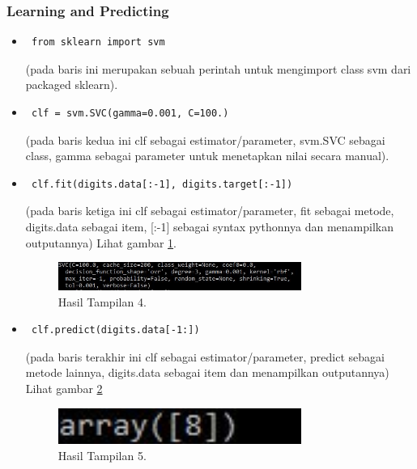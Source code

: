 \subsubsection{Learning and Predicting}
\begin{itemize}
\item\begin{verbatim} from sklearn import svm\end{verbatim}(pada baris ini merupakan sebuah perintah untuk mengimport class svm dari packaged sklearn).
\item\begin{verbatim} clf = svm.SVC(gamma=0.001, C=100.)\end{verbatim}(pada baris kedua ini clf sebagai estimator/parameter, svm.SVC sebagai class, gamma sebagai parameter untuk menetapkan nilai secara manual).
\item\begin{verbatim} clf.fit(digits.data[:-1], digits.target[:-1])\end{verbatim}(pada baris ketiga ini clf sebagai estimator/parameter, fit sebagai metode, digits.data sebagai item, [:-1] sebagai syntax pythonnya dan menampilkan outputannya) Lihat gambar \ref{13}.
\begin{figure}[!htbp]\centerline{\includegraphics[width=0.75\textwidth]{figures/huda/13.JPG}}\caption{Hasil Tampilan 4.}\label{13}\end{figure}
\item\begin{verbatim} clf.predict(digits.data[-1:])\end{verbatim}(pada baris terakhir ini clf sebagai estimator/parameter, predict sebagai metode lainnya, digits.data sebagai item dan menampilkan outputannya) Lihat gambar \ref{14}
\begin{figure}[!htbp]\centerline{\includegraphics[width=0.75\textwidth]{figures/huda/14.JPG}}\caption{Hasil Tampilan 5.}\label{14}\end{figure}
\end{itemize}
